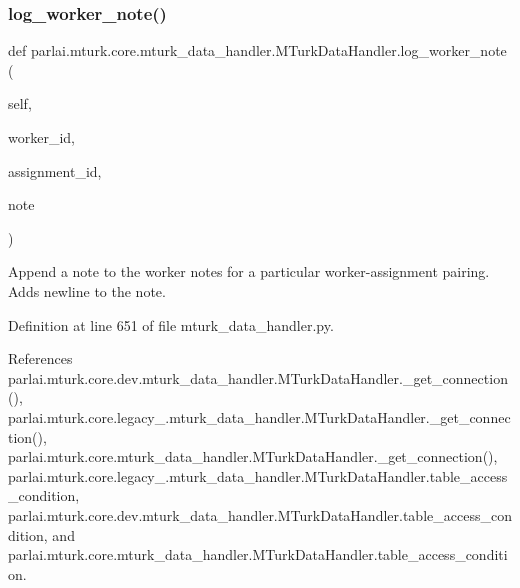\subsubsection{\texorpdfstring{log\+\_\+worker\+\_\+note()}{log\_worker\_note()}}
{\footnotesize\ttfamily def parlai.\+mturk.\+core.\+mturk\+\_\+data\+\_\+handler.\+M\+Turk\+Data\+Handler.\+log\+\_\+worker\+\_\+note (\begin{DoxyParamCaption}\item[{}]{self,  }\item[{}]{worker\+\_\+id,  }\item[{}]{assignment\+\_\+id,  }\item[{}]{note }\end{DoxyParamCaption})}

\begin{DoxyVerb}Append a note to the worker notes for a particular worker-assignment
pairing. Adds newline to the note.
\end{DoxyVerb}
 

Definition at line 651 of file mturk\+\_\+data\+\_\+handler.\+py.



References parlai.\+mturk.\+core.\+dev.\+mturk\+\_\+data\+\_\+handler.\+M\+Turk\+Data\+Handler.\+\_\+get\+\_\+connection(), parlai.\+mturk.\+core.\+legacy\+\_.\+mturk\+\_\+data\+\_\+handler.\+M\+Turk\+Data\+Handler.\+\_\+get\+\_\+connection(), parlai.\+mturk.\+core.\+mturk\+\_\+data\+\_\+handler.\+M\+Turk\+Data\+Handler.\+\_\+get\+\_\+connection(), parlai.\+mturk.\+core.\+legacy\+\_.\+mturk\+\_\+data\+\_\+handler.\+M\+Turk\+Data\+Handler.\+table\+\_\+access\+\_\+condition, parlai.\+mturk.\+core.\+dev.\+mturk\+\_\+data\+\_\+handler.\+M\+Turk\+Data\+Handler.\+table\+\_\+access\+\_\+condition, and parlai.\+mturk.\+core.\+mturk\+\_\+data\+\_\+handler.\+M\+Turk\+Data\+Handler.\+table\+\_\+access\+\_\+condition.

